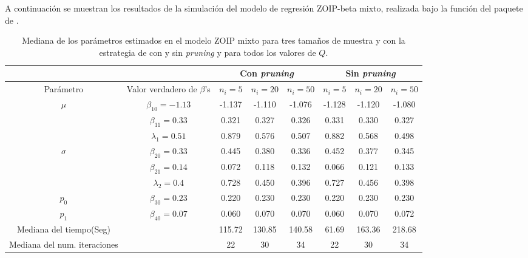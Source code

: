 A continuaci\'{o}n se muestran los resultados de la simulaci\'{o}n del modelo de regresi\'{o}n ZOIP-beta mixto, realizada bajo la funci\'{o}n  del paquete  de .\\

\begin{table}[!hbt]
{\scriptsize
\begin{center}
\begin{tabular}{|c|c|c|c|c|c|c|c|}\hline
& & \multicolumn{3}{|c|}{Con \textit{pruning}} & \multicolumn{3}{|c|}{Sin \textit{pruning}} \\ \hline
Par\'{a}metro & Valor verdadero de $\beta$'s & $n_i=5$ & $n_i=20$ & $n_i=50$ & $n_i=5$ & $n_i=20$ & $n_i=50$ \\ \hline \hline
\multirow{3}{*}{$\mu$} & $\beta_{10}=-1.13$ & -1.137	&-1.110	&-1.076	&-1.128	&-1.120	&-1.080 \\ 
& $\beta_{11}=0.33$ & 0.321	&0.327	&0.326	&0.331	&0.330	&0.327 \\
& $\lambda_1=0.51$ & 0.879	&0.576	&0.507	&0.882	&0.568	&0.498 \\ \hline
\multirow{3}{*}{$\sigma$} & $\beta_{20}=0.33$ & 0.445	&0.380	&0.336	&0.452	&0.377	&0.345 \\ 
& $\beta_{21}=0.14$ & 0.072	&0.118	&0.132	&0.066	&0.121	&0.133\\
& $\lambda_2=0.4$ & 0.728	&0.450	&0.396	&0.727	&0.456	&0.398\\ \hline
$p_0$& $\beta_{30}=0.23$ &0.220	&0.230	&0.230	&0.220	&0.230	&0.230 \\ \hline
$p_1$& $\beta_{40}=0.07$ &0.060	&0.070	&0.070	&0.060	&0.070	&0.072 \\ \hline
Mediana del tiempo(Seg)& &115.72	&130.85	&140.58	&61.69	&163.36	&218.68 \\ \hline
Mediana del num. iteraciones& &22	&30	&34	&22	&30	&34 \\ \hline
\end{tabular}
\caption{Mediana de los par\'{a}metros estimados en el modelo ZOIP mixto para tres tama\~{n}os de muestra y con la estrategia de con y sin \textit{pruning} y para todos los valores de $Q$.}
\label{T_Sim_mix_ni}
\end{center}
}
\end{table}

